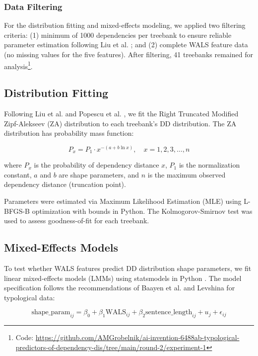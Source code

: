 \documentclass[11pt,letterpaper]{article}
\begin{document}
\subsubsection{Data Filtering}

For the distribution fitting and mixed-effects modeling, we applied two filtering criteria: (1) minimum of 1000 dependencies per treebank to ensure reliable parameter estimation following Liu et al. \cite{Liu2017}; and (2) complete WALS feature data (no missing values for the five features). After filtering, 41 treebanks remained for analysis\footnote{Code: \url{https://github.com/AMGrobelnik/ai-invention-6488ab-typological-predictors-of-dependency-dis/tree/main/round-2/experiment-1}}.

\subsection{Distribution Fitting}

Following Liu et al. \cite{Liu2017} and Popescu et al. \cite{Popescu2014}, we fit the Right Truncated Modified Zipf-Alekseev (ZA) distribution to each treebank's DD distribution. The ZA distribution has probability mass function:

\begin{equation}
P_x = P_1 \cdot x^{-(a + b\ln x)}, \quad x = 1, 2, 3, \ldots, n
\label{eq:za_dist}
\end{equation}

where $P_x$ is the probability of dependency distance $x$, $P_1$ is the normalization constant, $a$ and $b$ are shape parameters, and $n$ is the maximum observed dependency distance (truncation point).

Parameters were estimated via Maximum Likelihood Estimation (MLE) using L-BFGS-B optimization with bounds in Python. The Kolmogorov-Smirnov test was used to assess goodness-of-fit for each treebank.

\subsection{Mixed-Effects Models}

To test whether WALS features predict DD distribution shape parameters, we fit linear mixed-effects models (LMMs) using statsmodels in Python \cite{Jolly2021}. The model specification follows the recommendations of Baayen et al. \cite{Baayen2008} and Levshina \cite{Levshina2021} for typological data:

\begin{equation}
\text{shape\_param}_{ij} = \beta_0 + \beta_1 \text{WALS}_{ij} + \beta_2 \text{sentence\_length}_{ij} + u_j + \epsilon_{ij}
\label{eq:mixed_model}
\end{equation}
\end{document}
